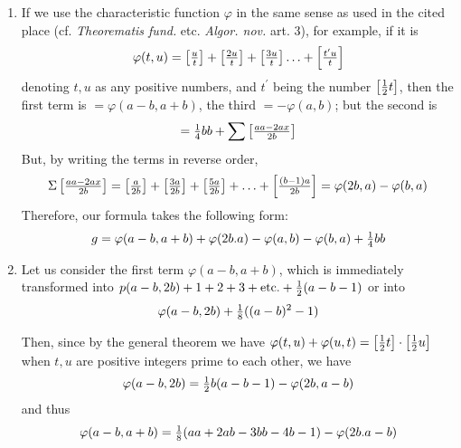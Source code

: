 \documentclass[twoside,12pt, showframe]{memoir}
\let\oldfrac\frac
\def\frac#1#2{\mathchoice{\tfrac{#1}{#2}}{\oldfrac{#1}{#2}}{\genfrac{}{}{}{2}{#1}{#2\mathstrut}}{\genfrac{}{}{}{3}{#1}{#2\mathstrut}}}
\begin{document}
\begin{enumerate}
    \item If we use the characteristic function \(\varphi\) in the same sense as used in the cited place (cf. \textit{Theorematis fund.} etc. \textit{Algor. nov.} art. 3), for example, if it is
    \[\varphi(t, u)=\left[\frac{u}{t}\right]+\left[\frac{2 u}{t}\right]+\left[\frac{3 u}{t}\right] \ldots+\left[\frac{t^{\prime} u}{t}\right]\]
    denoting \(t, u\) as any positive numbers, and \(t^{\prime}\) being the number \(\left[\frac{1}{2} t\right]\), then the first term is \(=\varphi(a-b, a+b)\), the third \(=-\varphi(a, b)\); but the second is
    \[ =\frac{1}{4} b b+\sum\left[\frac{a a-2 a x}{2 b}\right]\]
    But, by writing the terms in reverse order,
    \[\Sigma\left[\frac{a a-2 a x}{2 b}\right]=\left[\frac{a}{2 b}\right]+\left[\frac{3 a}{2 b}\right]+\left[\frac{5 a}{2 b}\right]+\ldots+\left[\frac{(b-1) a}{2 b}\right]=\varphi(2 b, a)-\varphi(b, a)\]
    Therefore, our formula takes the following form:
    \[g=\varphi(a-b, a+b)+\varphi(2 b . a)-\varphi(a, b)-\varphi(b, a)+\frac{1}{4} b b\]
    
    \item Let us consider the first term \(\varphi(a-b, a+b)\), which is immediately transformed into \(p(a-b, 2 b)+1+2+3+\text{etc.}+\frac{1}{2}(a-b-1)\) or into
    \[\varphi(a-b, 2 b)+\frac{1}{8}((a-b)^{2}-1)\]
    
    Then, since by the general theorem we have \(\varphi(t, u)+\varphi(u, t)=\left[\frac{1}{2} t\right] \cdot\left[\frac{1}{2} u\right]\) when \(t, u\) are positive integers prime to each other, we have
    \[\varphi(a-b, 2 b)=\frac{1}{2} b(a-b-1)-\varphi(2 b, a-b)\]
    and thus
    \[\varphi(a-b, a+b)=\frac{1}{8}(a a+2 a b-3 b b-4 b-1)-\varphi(2 b . a-b)\]
\end{enumerate}
%
\end{document}
